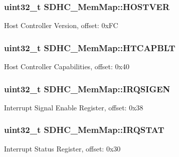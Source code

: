 \subsubsection[{H\+O\+S\+T\+V\+E\+R}]{\setlength{\rightskip}{0pt plus 5cm}uint32\+\_\+t S\+D\+H\+C\+\_\+\+Mem\+Map\+::\+H\+O\+S\+T\+V\+E\+R}\label{struct_s_d_h_c___mem_map_a27ec00dc3be305a561fae9978fe799a2}
Host Controller Version, offset\+: 0x\+F\+C \hypertarget{struct_s_d_h_c___mem_map_ae8e1450bf44904b339a9d799f54f2847}{}
\subsubsection[{H\+T\+C\+A\+P\+B\+L\+T}]{\setlength{\rightskip}{0pt plus 5cm}uint32\+\_\+t S\+D\+H\+C\+\_\+\+Mem\+Map\+::\+H\+T\+C\+A\+P\+B\+L\+T}\label{struct_s_d_h_c___mem_map_ae8e1450bf44904b339a9d799f54f2847}
Host Controller Capabilities, offset\+: 0x40 \hypertarget{struct_s_d_h_c___mem_map_a21516e4f38134a06a1f1dc718676e72e}{}
\subsubsection[{I\+R\+Q\+S\+I\+G\+E\+N}]{\setlength{\rightskip}{0pt plus 5cm}uint32\+\_\+t S\+D\+H\+C\+\_\+\+Mem\+Map\+::\+I\+R\+Q\+S\+I\+G\+E\+N}\label{struct_s_d_h_c___mem_map_a21516e4f38134a06a1f1dc718676e72e}
Interrupt Signal Enable Register, offset\+: 0x38 \hypertarget{struct_s_d_h_c___mem_map_accf3cc2723054bbe32bb641e670d19e3}{}
\subsubsection[{I\+R\+Q\+S\+T\+A\+T}]{\setlength{\rightskip}{0pt plus 5cm}uint32\+\_\+t S\+D\+H\+C\+\_\+\+Mem\+Map\+::\+I\+R\+Q\+S\+T\+A\+T}\label{struct_s_d_h_c___mem_map_accf3cc2723054bbe32bb641e670d19e3}
Interrupt Status Register, offset\+: 0x30 \hypertarget{struct_s_d_h_c___mem_map_a6bc70391d95768a1b757bf17731f5f97}{}
